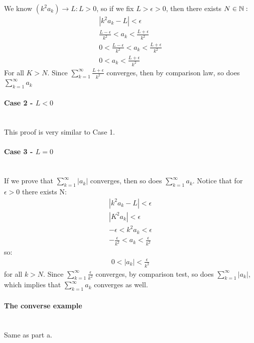 \documentclass[11pt]{article}
\begin{document}
We know $(k^2a_k)\rightarrow L:L>0$, so if we fix $L>\epsilon>0$, then there exists $N\in\mathbb{N}:$
\begin{align*}
	|k^2a_k-L|<\epsilon\\
	\frac{L-\epsilon}{k^2}<a_k<\frac{L+\epsilon}{k^2}\\
	0<\frac{L-\epsilon}{k^2}<a_k<\frac{L+\epsilon}{k^2}\\
	0<a_k<\frac{L+\epsilon}{k^2}
\end{align*}
For all $K>N$. Since $\sum\limits_{k=1}^{\infty}\frac{L+\epsilon}{k^2}$ converges, then by comparison law, so does $\sum\limits_{k=1}^{\infty}a_k$

\paragraph{Case 2 - $L<0$} ~\\

This proof is very similar to Case 1.

\paragraph{Case 3 - $L=0$} ~\\

If we prove that $\sum\limits_{k=1}^{\infty}|a_k|$ converges, then so does $\sum\limits_{k=1}^{\infty}a_k$.
Notice that for $\epsilon>0$ there exists N:
\begin{align*}
	{|k^2a_k-L|<\epsilon}\\
	{|K^2a_k|<\epsilon}\\
	{-\epsilon<k^2a_k<\epsilon}\\
	{-\frac{\epsilon}{k^2}}<a_k<\frac{\epsilon}{k^2}
\end{align*}
so:
\begin{align*}
	0<|a_k|<\frac{\epsilon}{k^2}
\end{align*}
for all $k>N$. Since $\sum\limits_{k=1}^{\infty}\frac{\epsilon}{k^2}$ converges, by comparison test, so does $\sum\limits_{k=1}^{\infty}|a_k|$, which implies that $\sum\limits_{k=1}^{\infty}a_k$ converges as well.

\paragraph{The converse example} ~\\ 

Same as part a.
\end{document}
